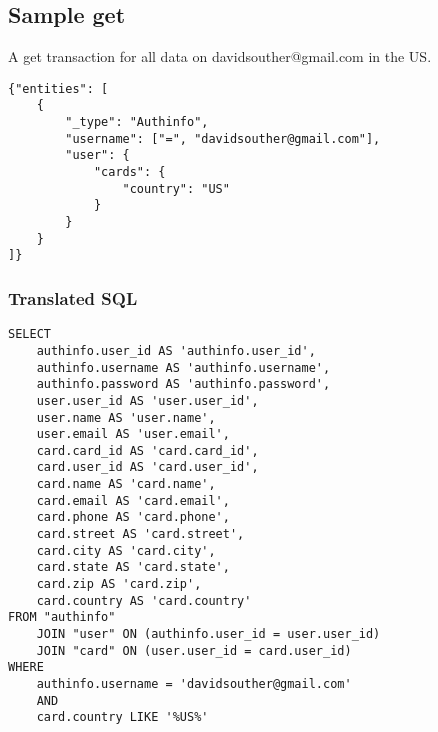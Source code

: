 \documentclass{article}
\begin{document}
\subsection{Sample {\ilcode get}}
A {\ilcode get} transaction for all data on davidsouther@gmail.com in the US.
\linespread{1}
\begin{lstlisting}
{"entities": [
	{
		"_type": "Authinfo",
		"username": ["=", "davidsouther@gmail.com"],
		"user": {
			"cards": {
				"country": "US"
			}
		}
	}
]}
\end{lstlisting}
\subsubsection{Translated SQL}

\lstset{language=SQL}
\begin{lstlisting}
SELECT
	authinfo.user_id AS 'authinfo.user_id',
	authinfo.username AS 'authinfo.username',
	authinfo.password AS 'authinfo.password',
	user.user_id AS 'user.user_id',
	user.name AS 'user.name',
	user.email AS 'user.email',
	card.card_id AS 'card.card_id',
	card.user_id AS 'card.user_id',
	card.name AS 'card.name',
	card.email AS 'card.email',
	card.phone AS 'card.phone',
	card.street AS 'card.street',
	card.city AS 'card.city',
	card.state AS 'card.state',
	card.zip AS 'card.zip',
	card.country AS 'card.country'
FROM "authinfo"
	JOIN "user" ON (authinfo.user_id = user.user_id)
	JOIN "card" ON (user.user_id = card.user_id)
WHERE
	authinfo.username = 'davidsouther@gmail.com'
	AND
	card.country LIKE '%US%'
\end{lstlisting}
\end{document}
